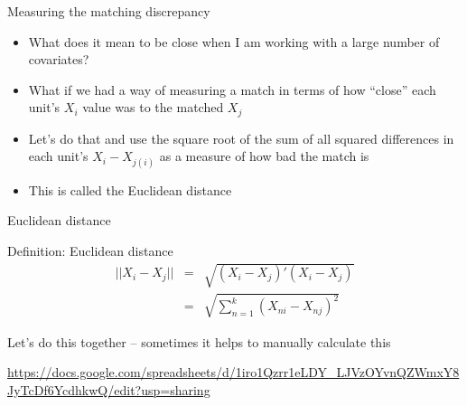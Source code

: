 \documentclass{beamer}
\newcommand*\colvec[1]{\begin{pmatrix}#1\end{pmatrix}}
\begin{document}
%



\begin{frame}{Measuring the matching discrepancy}

\begin{itemize}
\item What does it mean to be close when I am working with a large number of covariates?
\item What if we had a way of measuring a match in terms of how ``close'' each unit's $X_i$ value was to the matched $X_j$
\item Let's do that and use the square root of the sum of all squared differences in each unit's $X_i - X_{j(i)}$ as a measure of how bad the match is
\item This is called the Euclidean distance
\end{itemize}


\end{frame}

	

\begin{frame}{Euclidean distance}
	\begin{block}{Definition: Euclidean distance}
    \vspace*{-2.5mm}
    \begin{eqnarray*}
    ||X_i-X_j|| &=& \sqrt{ (X_i-X_j)'(X_i-X_j) } \\
    &=& \sqrt{ \sum_{n=1}^k (X_{ni} - X_{nj})^2 }
    \end{eqnarray*}
    \vspace*{-2.5mm}
	\end{block}
	
Let's do this together -- sometimes it helps to manually calculate this

\bigskip

\url{https://docs.google.com/spreadsheets/d/1iro1Qzrr1eLDY_LJVzOYvnQZWmxY8JyTcDf6YcdhkwQ/edit?usp=sharing}

	
\end{frame}
\end{document}
